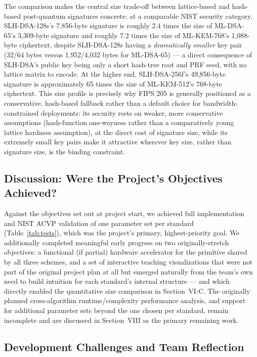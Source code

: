 \documentclass[10pt,conference]{IEEEtran}
\begin{document}
The comparison makes the central size trade-off between lattice-based
and hash-based post-quantum signatures concrete: at a comparable NIST
security category, SLH-DSA-128s's 7,856-byte signature is roughly 2.4
times the size of ML-DSA-65's 3,309-byte signature and roughly 7.2 times
the size of ML-KEM-768's 1,088-byte ciphertext, despite SLH-DSA-128s
having a \emph{dramatically smaller} key pair (32/64 bytes versus
1,952/4,032 bytes for ML-DSA-65) --- a direct consequence of SLH-DSA's
public key being only a short hash-tree root and PRF seed, with no
lattice matrix to encode. At the higher end, SLH-DSA-256f's 49,856-byte
signature is approximately 65 times the size of ML-KEM-512's 768-byte
ciphertext. This size profile is precisely why FIPS 205 is generally
positioned as a conservative, hash-based fallback rather than a default
choice for bandwidth-constrained deployments: its security rests on
weaker, more conservative assumptions (hash-function one-wayness rather
than a comparatively young lattice hardness assumption), at the direct
cost of signature size, while its extremely small key pairs make it
attractive wherever key size, rather than signature size, is the binding
constraint.

\subsection{Discussion: Were the Project's Objectives Achieved?}

Against the objectives set out at project start, we achieved full
implementation and NIST ACVP validation of one parameter set per
standard (Table~\ref{tab:tests}), which was the project's primary,
highest-priority goal. We additionally completed meaningful early
progress on two originally-stretch objectives: a functional (if partial)
hardware accelerator for the primitive shared by all three schemes, and
a set of interactive teaching visualizations that were not part of the
original project plan at all but emerged naturally from the team's own
need to build intuition for each standard's internal structure --- and
which directly enabled the quantitative size comparison in
Section~VI-C. The originally planned cross-algorithm runtime/complexity
performance analysis, and support for additional parameter sets beyond
the one chosen per standard, remain incomplete and are discussed in
Section~VIII as the primary remaining work.

\subsection{Development Challenges and Team Reflection}
\end{document}
